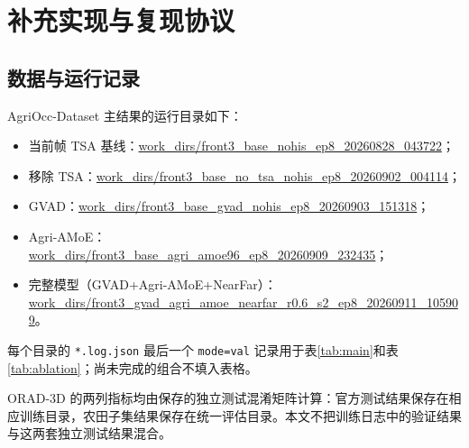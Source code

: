 \section{补充实现与复现协议}\label{app:implementation}

\subsection{数据与运行记录}
AgriOcc-Dataset 主结果的运行目录如下：
{\footnotesize
\begin{itemize}[leftmargin=1.8em,noitemsep]
  \item 当前帧 TSA 基线：\url{work_dirs/front3_base_nohis_ep8_20260828_043722}；
  \item 移除 TSA：\url{work_dirs/front3_base_no_tsa_nohis_ep8_20260902_004114}；
  \item GVAD：\url{work_dirs/front3_base_gvad_nohis_ep8_20260903_151318}；
  \item Agri-AMoE：\url{work_dirs/front3_base_agri_amoe96_ep8_20260909_232435}；
  \item 完整模型（GVAD+Agri-AMoE+NearFar）：\url{work_dirs/front3_gvad_agri_amoe_nearfar_r0.6_s2_ep8_20260911_105909}。
\end{itemize}
}
每个目录的 \texttt{*.log.json} 最后一个 \texttt{mode=val} 记录用于表\ref{tab:main}和表\ref{tab:ablation}；尚未完成的组合不填入表格。

ORAD-3D 的两列指标均由保存的独立测试混淆矩阵计算：官方测试结果保存在相应训练目录，农田子集结果保存在统一评估目录。本文不把训练日志中的验证结果与这两套独立测试结果混合。
